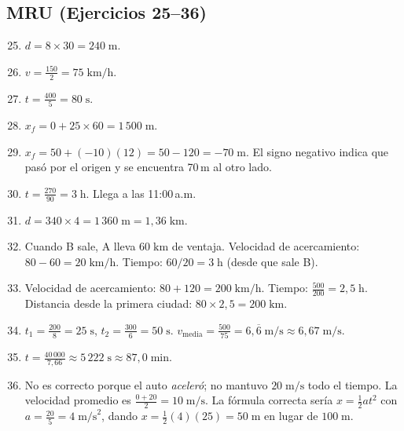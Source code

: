 \documentclass[12pt, a4paper]{article}
\begin{document}
\subsection*{MRU (Ejercicios 25--36)}

\begin{enumerate}[leftmargin=*, label=\textbf{\arabic*.}]
  \setcounter{enumi}{24}
  \item $d = 8 \times 30 = 240\;\text{m}$.

  \item $v = \frac{150}{2} = 75\;\text{km/h}$.

  \item $t = \frac{400}{5} = 80\;\text{s}$.

  \item $x_f = 0 + 25 \times 60 = 1\,500\;\text{m}$.

  \item $x_f = 50 + (-10)(12) = 50 - 120 = -70\;\text{m}$. El signo negativo indica que pasó por el origen y se encuentra 70\,m al otro lado.

  \item $t = \frac{270}{90} = 3\;\text{h}$. Llega a las 11:00\,a.m.

  \item $d = 340 \times 4 = 1\,360\;\text{m} = 1{,}36\;\text{km}$.

  \item Cuando B sale, A lleva $60\;\text{km}$ de ventaja. Velocidad de acercamiento: $80 - 60 = 20\;\text{km/h}$. Tiempo: $60/20 = 3\;\text{h}$ (desde que sale B).

  \item Velocidad de acercamiento: $80 + 120 = 200\;\text{km/h}$. Tiempo: $\frac{500}{200} = 2{,}5\;\text{h}$. Distancia desde la primera ciudad: $80 \times 2{,}5 = 200\;\text{km}$.

  \item $t_1 = \frac{200}{8} = 25\;\text{s}$, $t_2 = \frac{300}{6} = 50\;\text{s}$. $v_{\text{media}} = \frac{500}{75} = 6{,}\overline{6}\;\text{m/s} \approx 6{,}67\;\text{m/s}$.

  \item $t = \frac{40\,000}{7{,}66} \approx 5\,222\;\text{s} \approx 87{,}0\;\text{min}$.

  \item No es correcto porque el auto \emph{aceleró}; no mantuvo $20\;\text{m/s}$ todo el tiempo. La velocidad promedio es $\frac{0 + 20}{2} = 10\;\text{m/s}$. La fórmula correcta sería $x = \frac{1}{2}at^2$ con $a = \frac{20}{5} = 4\;\text{m/s}^2$, dando $x = \frac{1}{2}(4)(25) = 50\;\text{m}$ en lugar de $100\;\text{m}$.
\end{enumerate}
\end{document}
